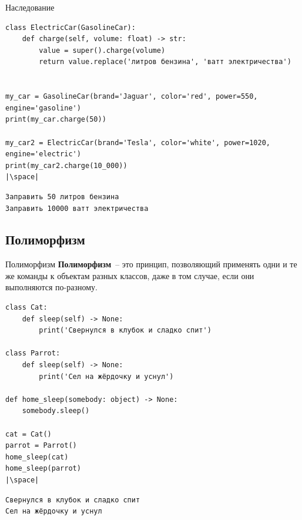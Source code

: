 \documentclass[aspectratio=169, mathserif]{beamer}	%
\begin{document}
\begin{frame}[fragile]{Наследование}
\scriptsize
\begin{verbatim}
class ElectricCar(GasolineCar):
    def charge(self, volume: float) -> str:
        value = super().charge(volume)
        return value.replace('литров бензина', 'ватт электричества')


my_car = GasolineCar(brand='Jaguar', color='red', power=550, engine='gasoline')
print(my_car.charge(50))

my_car2 = ElectricCar(brand='Tesla', color='white', power=1020, engine='electric')
print(my_car2.charge(10_000))
|\space|
\end{verbatim}
\begin{verbatim}
Заправить 50 литров бензина
Заправить 10000 ватт электричества
\end{verbatim}
\vfill
\end{frame}


\subsection{Полиморфизм}
\begin{frame}[fragile]{Полиморфизм}
\scriptsize
\textcolor{tpugreen}{\textbf{Полиморфизм}}~-- это принцип, позволяющий применять одни и те же команды к объектам разных классов, даже в том случае, если они выполняются по-разному.
\vfill
\begin{verbatim}
class Cat:
    def sleep(self) -> None:
        print('Свернулся в клубок и сладко спит')

class Parrot:
    def sleep(self) -> None:
        print('Сел на жёрдочку и уснул')

def home_sleep(somebody: object) -> None:
    somebody.sleep()

cat = Cat()
parrot = Parrot()
home_sleep(cat)
home_sleep(parrot)
|\space|
\end{verbatim}
\begin{verbatim}
Свернулся в клубок и сладко спит
Сел на жёрдочку и уснул
\end{verbatim}
\vfill
\end{frame}
\end{document}
